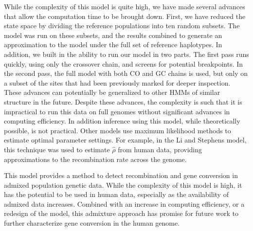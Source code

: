 While the complexity of this model is quite high, we have made several advances that allow the computation time to be brought down.
First, we have reduced the state space by dividing the reference populations into ten random subsets.
The model was run on these subsets, and the results combined to generate an approximation to the model under the full set of reference haplotypes.
In addition, we built in the ability to run our model in two parts.
The first pass runs quickly, using only the crossover chain, and screens for potential breakpoints.
In the second pass, the full model with both CO and GC chains is used, but only on a subset of the sites that had been previously marked for deeper inspection.
These advances can potentially be generalized to other HMMs of similar structure in the future.
Despite these advances, the complexity is such that it is impractical to run this data on full genomes without significant advances in computing efficiency.
In addition inference using this model, while theoretically possible, is not practical.
Other models use maximum likelihood methods to estimate optimal parameter settings.
For example, in the Li and Stephens model, this technique was used to estimate $\hat{\rho}$ from human data, providing approximations to the recombination rate across the genome.

This model provides a method to detect recombination and gene conversion in admixed population genetic data.
While the complexity of this model is high, it has the potential to be used in human data, especially as the availability of admixed data increases.
Combined with an increase in computing efficiency, or a redesign of the model, this admixture approach has promise for future work to further characterize gene conversion in the human genome.




\clearpage
\renewcommand{\bibname}{References}

\begingroup
    \setlength{\bibsep}{10pt}
    \linespread{1}\selectfont
    
\endgroup

